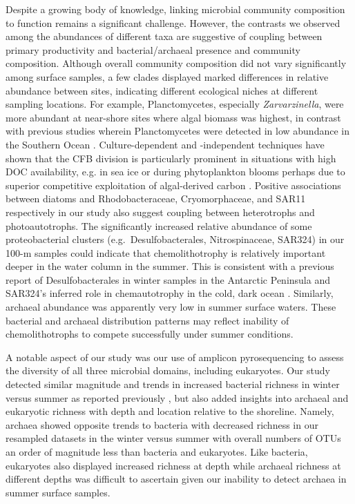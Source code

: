 Despite a growing body of knowledge, linking microbial community composition to function remains a significant challenge. However, the contrasts we observed among the abundances of different taxa are suggestive of coupling between primary productivity and bacterial/archaeal presence and community composition. Although overall community composition did not vary significantly among surface samples, a few clades displayed marked differences in relative abundance between sites, indicating different ecological niches at different sampling locations. For example, Planctomycetes, especially \textit{Zarvarzinella}, were more abundant at near-shore sites where algal biomass was highest, in contrast with previous studies wherein Planctomycetes were detected in low abundance in the Southern Ocean \citep{wywabdlc13}. Culture-dependent and -independent techniques have shown that the CFB division is particularly prominent in situations with high DOC availability, e.g. in sea ice \citep{bkjwah03} or during phytoplankton blooms \citep{Glockner1999-yc,Abell2005-vh} perhaps due to superior competitive exploitation of algal-derived carbon \citep{pfgwwa11}. Positive associations between diatoms and Rhodobacteraceae, Cryomorphaceae, and SAR11 respectively in our study also suggest coupling between heterotrophs and photoautotrophs. The significantly increased relative abundance of some proteobacterial clusters (e.g.~Desulfobacterales, Nitrospinaceae, SAR324) in our 100-m samples could indicate that chemolithotrophy is relatively important deeper in the water column \citep{grwddecm12} in the summer. This is consistent with a previous report of Desulfobacterales in winter samples in the Antarctic Peninsula \citep{Ghiglione2012-qm} and SAR324's inferred role in chemautotrophy in the cold, dark ocean \citep{smpswlrpmgsdhs11}. Similarly, archaeal abundance was apparently very low in summer surface waters. These bacterial and archaeal distribution patterns may reflect inability of chemolithotrophs to compete successfully under summer conditions.

A notable aspect of our study was our use of amplicon pyrosequencing to assess the diversity of all three microbial domains, including eukaryotes. Our study detected similar magnitude and trends in increased bacterial richness in winter versus summer as reported previously \citep{Ghiglione2012-qm}, but also added insights into archaeal and eukaryotic richness with depth and location relative to the shoreline. Namely, archaea showed opposite trends to bacteria with decreased richness in our resampled datasets in the winter versus summer with overall numbers of OTUs an order of magnitude less than bacteria and eukaryotes. Like bacteria, eukaryotes also displayed increased richness at depth while archaeal richness at different depths was difficult to ascertain given our inability to detect archaea in summer surface samples.

